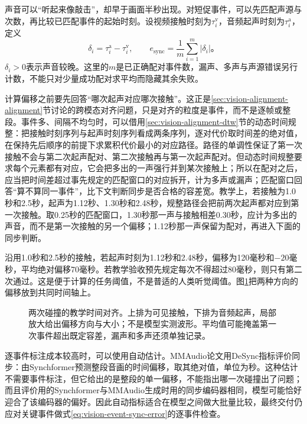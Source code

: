 声音可以“听起来像敲击”，却早于画面半秒出现。对短促事件，可以先匹配声源与次数，再比较已匹配事件的起始时刻。设视频接触时刻为$\tau_i^{\mathrm v}$，音频起声时刻为$\tau_i^{\mathrm a}$，定义
\begin{equation}
  \delta_i=\tau_i^{\mathrm a}-\tau_i^{\mathrm v},
  \qquad
  e_{\mathrm{sync}}=\frac1m\sum_{i=1}^{m}|\delta_i|\text{。}
  \label{eq:vision-event-sync-error}
\end{equation}
$\delta_i>0$表示声音较晚。这里的$m$是已正确配对事件数，漏声、多声与声源错误另行计数，不能只对少量成功配对求平均而隐藏其余失败。

计算偏移之前要先回答“哪次起声对应哪次接触”。这正是\ref{sec:vision-alignment-alignment}节讨论的跨模态对齐问题，只是对齐的粒度是事件，而不是逐帧或整段。事件多、间隔不均匀时，可以借用\ref{sec:vision-alignment-dtw}节的动态时间规整：把接触时刻序列与起声时刻序列看成两条序列，逐对代价取时间差的绝对值，在保持先后顺序的前提下求累积代价最小的对应路径。路径的单调性保证了第一次接触不会与第二次起声配对、第二次接触再与第一次起声配对。但动态时间规整要求每个元素都有对应，它会把多出的一声强行并到某次接触上；所以在配对之后，应当把时间差超过事先规定的匹配窗口的对应拆开，计为多声或漏声；匹配窗口回答“算不算同一事件”，比下文判断同步是否合格的容差宽。教学上，若接触为1.0秒和2.5秒，起声为1.12秒、1.30秒和2.48秒，规整路径会把前两次起声都对应到第一次接触。取0.25秒的匹配窗口，1.30秒那一声与接触相差0.30秒，应计为多出的声音，而不是第一次接触的另一个偏移；1.12秒那一声保留为配对，再进入下面的同步判断。

沿用1.0秒和2.5秒的接触，若起声时刻为1.12秒和2.48秒，偏移为120毫秒和$-20$毫秒，平均绝对偏移70毫秒。若教学验收预先规定每次不得超过80毫秒，则只有第二次通过。这是便于计算的任务阈值，不是普适的人类听觉阈值。图\ref{fig:vision-event-sync}把两种方向的偏移放到共同时间轴上。

\begin{figure}[htbp]
  \centering
  
  \caption{两次碰撞的教学时间对齐。上排为可见接触，下排为音频起声，局部放大给出偏移方向与大小；不是模型实测波形。平均值可能掩盖第一次事件超出既定容差，漏声和多声还须单独记录。}
  \label{fig:vision-event-sync}
\end{figure}
\FloatBarrier

逐事件标注成本较高时，可以使用自动估计。MMAudio论文用DeSync指标评价同步：由Synchformer预测整段音画的时间偏移，取其绝对值，单位为秒。这种估计不需要事件标注，但它给出的是整段的单一偏移，不能指出哪一次碰撞出了问题；而且评价用的Synchformer与MMAudio生成时用的同步编码器相同，模型可能恰好迎合了该编码器的偏好。因此自动指标适合在模型之间做大批量比较，最终交付仍应对关键事件做式\eqref{eq:vision-event-sync-error}的逐事件检查。

